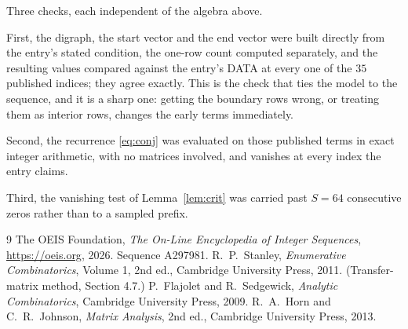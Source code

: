 \documentclass[11pt,a4paper]{article}
\theoremstyle{plain}
\theoremstyle{definition}
\begin{document}
Three checks, each independent of the algebra above.

First, the digraph, the start vector and the end vector were built directly from the
entry's stated condition, the one-row count computed separately, and the resulting values
compared against the entry's DATA at every one of the $35$ published indices; they
agree exactly. This is the check that ties the model to the sequence, and it is a sharp one:
getting the boundary rows wrong, or treating them as interior rows, changes the early terms
immediately.

Second, the recurrence \eqref{eq:conj} was evaluated on those published terms in exact
integer arithmetic, with no matrices involved, and vanishes at every index the entry claims.

Third, the vanishing test of Lemma~\ref{lem:crit} was carried past $S=64$ consecutive
zeros rather than to a sampled prefix.

\begin{thebibliography}{9}
 The OEIS Foundation, \emph{The On-Line Encyclopedia of Integer
Sequences}, \url{https://oeis.org}, 2026. Sequence A297981.
 R.~P.~Stanley, \emph{Enumerative Combinatorics}, Volume 1, 2nd ed.,
Cambridge University Press, 2011. (Transfer-matrix method, Section 4.7.)
 P.~Flajolet and R.~Sedgewick, \emph{Analytic Combinatorics}, Cambridge
University Press, 2009.
 R.~A.~Horn and C.~R.~Johnson, \emph{Matrix Analysis}, 2nd ed., Cambridge
University Press, 2013.
\end{thebibliography}
\end{document}
